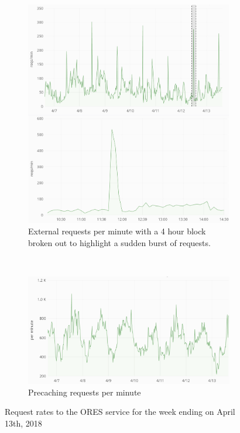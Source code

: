 \begin{figure}[h]
\centering
\begin{subfigure}[t]{\textwidth}
  \centering
  \includegraphics[width=.6\textwidth]{figures/ORES_request_activity_201804_week_vs_4hours}
  \caption{External requests per minute with a 4 hour block broken out to highlight a sudden burst of requests.}
  \label{fig:ores_request_rate}
\end{subfigure}\\
\begin{subfigure}[t]{\columnwidth}
  \centering
  \includegraphics[width=.6\textwidth]{figures/ORES_precache_request_rate_201804}
  \caption{Precaching requests per minute}
  \label{fig:ores_precache_rate}
\end{subfigure}
\caption{Request rates to the ORES service for the week ending on April 13th, 2018}
\label{fig:ores_activity}
\end{figure}
